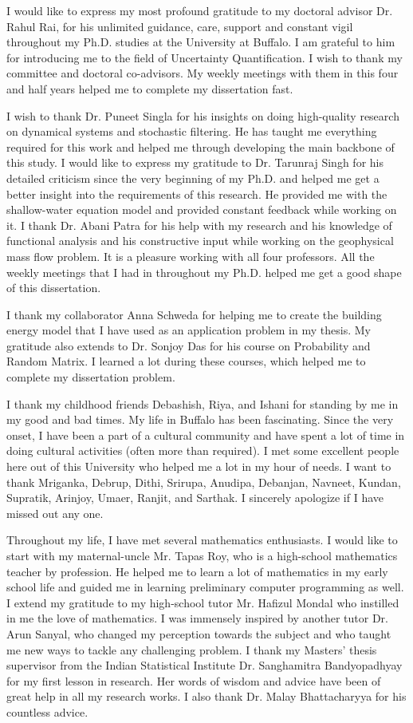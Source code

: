 I would like to express my most profound gratitude to my doctoral advisor Dr. Rahul Rai, for his unlimited guidance, care, support and constant vigil throughout my Ph.D. studies at the University at Buffalo. I am grateful to him for introducing me to the field of Uncertainty Quantification. I wish to thank my committee and doctoral co-advisors. My weekly meetings with them in this four and half years helped me to complete my dissertation fast.

I wish to thank Dr. Puneet Singla for his insights on doing high-quality research on dynamical systems and stochastic filtering. He has taught me everything required for this work and helped me through developing the main backbone of this study. I would like to express my gratitude to Dr. Tarunraj Singh for his detailed criticism since the very beginning of my Ph.D. and helped me get a better insight into the requirements of this research. He provided me with the shallow-water equation model
and provided constant feedback while working on it. I thank Dr. Abani Patra for his help with my research and his knowledge of functional analysis and his constructive input while working on the geophysical mass flow problem. It is a pleasure working with all four professors. All the weekly meetings that I had in throughout my Ph.D. helped me get a good shape of this dissertation.

I thank my collaborator Anna Schweda for helping me to create the building energy model that I have used as an application problem in my thesis. My gratitude also extends to Dr. Sonjoy Das for his course on Probability and Random Matrix. I learned a lot during these courses, which helped me to complete my dissertation problem.

I thank my childhood friends Debashish, Riya, and Ishani for standing by me in my good and bad times. 
My life in Buffalo has been fascinating. Since the very onset, I have been a part of a cultural community and have spent a lot of time in doing cultural activities (often more than required). I met some excellent people here out of this University who helped me a lot in my hour of needs. I want to thank Mriganka, Debrup, Dithi, Srirupa, Anudipa, Debanjan, Navneet, Kundan, Supratik, Arinjoy, Umaer, Ranjit, and Sarthak. I sincerely apologize if I have missed out any one. 

Throughout my life, I have met several mathematics enthusiasts. I would like to start with my maternal-uncle Mr. Tapas Roy, who is a high-school mathematics teacher by profession. He helped me to learn a lot of mathematics in my early school life and guided me in learning preliminary computer programming as well. I extend my gratitude to my high-school tutor Mr. Hafizul Mondal who instilled in me the love of mathematics. I was immensely inspired by another tutor Dr. Arun Sanyal, who changed my perception towards the subject and who taught me new ways to tackle any challenging problem. I thank my Masters' thesis supervisor from the Indian Statistical Institute Dr. Sanghamitra Bandyopadhyay for my first lesson in research. Her words of wisdom and advice have been of great help in all my research works. I also thank Dr. Malay Bhattacharyya for his countless advice.    

